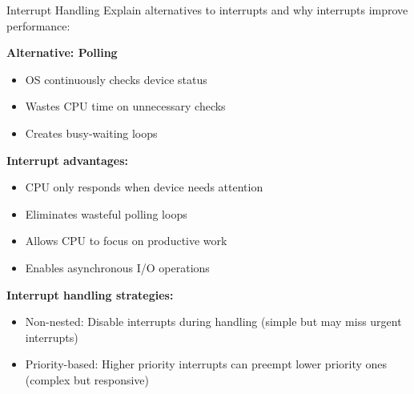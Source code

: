 \begin{example2}{Interrupt Handling}
    Explain alternatives to interrupts and why interrupts improve performance:
    
    \tcblower
    
    \textbf{Alternative: Polling}
    \begin{itemize}
        \item OS continuously checks device status
        \item Wastes CPU time on unnecessary checks
        \item Creates busy-waiting loops
    \end{itemize}
    
    \textbf{Interrupt advantages:}
    \begin{itemize}
        \item CPU only responds when device needs attention
        \item Eliminates wasteful polling loops
        \item Allows CPU to focus on productive work
        \item Enables asynchronous I/O operations
    \end{itemize}
    
    \textbf{Interrupt handling strategies:}
    \begin{itemize}
        \item Non-nested: Disable interrupts during handling (simple but may miss urgent interrupts)
        \item Priority-based: Higher priority interrupts can preempt lower priority ones (complex but responsive)
    \end{itemize}
\end{example2}

